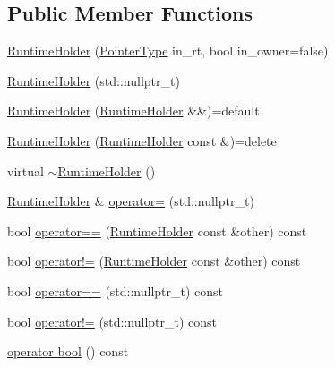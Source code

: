\subsection*{Public Member Functions}
\begin{DoxyCompactItemize}
\item 
\hyperlink{structvt_1_1runtime_1_1_runtime_holder_ace49b9a788a03d478f4938c98cfd0ea6}{Runtime\+Holder} (\hyperlink{structvt_1_1runtime_1_1_runtime_holder_a9740e8aa7487fcf38b67a7e160d7b046}{Pointer\+Type} in\+\_\+rt, bool in\+\_\+owner=false)
\item 
\hyperlink{structvt_1_1runtime_1_1_runtime_holder_aedf8343af437d6a295b40edaa61f1c84}{Runtime\+Holder} (std\+::nullptr\+\_\+t)
\item 
\hyperlink{structvt_1_1runtime_1_1_runtime_holder_a593b417829e31b5d2698d30b6aed232f}{Runtime\+Holder} (\hyperlink{structvt_1_1runtime_1_1_runtime_holder}{Runtime\+Holder} \&\&)=default
\item 
\hyperlink{structvt_1_1runtime_1_1_runtime_holder_a559e472b17957ee5ec83baf9af88972a}{Runtime\+Holder} (\hyperlink{structvt_1_1runtime_1_1_runtime_holder}{Runtime\+Holder} const \&)=delete
\item 
virtual \hyperlink{structvt_1_1runtime_1_1_runtime_holder_a835f3a9c7d875e05d4a8fffee0c1d430}{$\sim$\+Runtime\+Holder} ()
\item 
\hyperlink{structvt_1_1runtime_1_1_runtime_holder}{Runtime\+Holder} \& \hyperlink{structvt_1_1runtime_1_1_runtime_holder_a07fbb75fca325419cea85801f7208f22}{operator=} (std\+::nullptr\+\_\+t)
\item 
bool \hyperlink{structvt_1_1runtime_1_1_runtime_holder_a1a262aa7a539976d750c9c738e14c26f}{operator==} (\hyperlink{structvt_1_1runtime_1_1_runtime_holder}{Runtime\+Holder} const \&other) const
\item 
bool \hyperlink{structvt_1_1runtime_1_1_runtime_holder_a78e7bc2a7179792a29a0603c78e75406}{operator!=} (\hyperlink{structvt_1_1runtime_1_1_runtime_holder}{Runtime\+Holder} const \&other) const
\item 
bool \hyperlink{structvt_1_1runtime_1_1_runtime_holder_aa2fe6c7f3c4d55d44f182ae0a64edf97}{operator==} (std\+::nullptr\+\_\+t) const
\item 
bool \hyperlink{structvt_1_1runtime_1_1_runtime_holder_a7efa104bc201ac0fc143563358fd775a}{operator!=} (std\+::nullptr\+\_\+t) const
\item 
\hyperlink{structvt_1_1runtime_1_1_runtime_holder_a93f32ba2688662a743a914241d44a5fc}{operator bool} () const
\item 

\end{DoxyCompactItemize}
